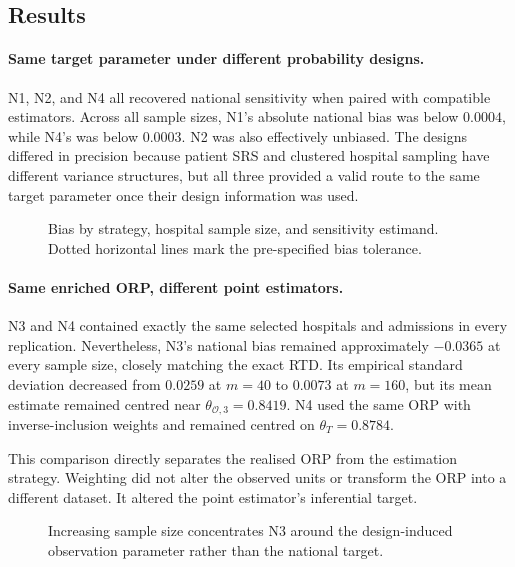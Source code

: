 \subsection{Results}

\paragraph{Same target parameter under different probability designs.}
N1, N2, and N4 all recovered national sensitivity when paired with compatible
estimators. Across all sample sizes, N1's absolute national bias was below
\(0.0004\), while N4's was below \(0.0003\). N2 was also effectively unbiased.
The designs differed in precision because patient SRS and clustered hospital
sampling have different variance structures, but all three provided a valid
route to the same target parameter once their design information was used.



\begin{figure}[h!]
  \centering
  \caption{Bias by strategy, hospital sample size, and sensitivity estimand. Dotted horizontal lines mark the pre-specified bias tolerance.}
  \label{fig:nav-bias}
\end{figure}

\paragraph{Same enriched ORP, different point estimators.}
N3 and N4 contained exactly the same selected hospitals and admissions in
every replication. Nevertheless, N3's national bias remained approximately
\(-0.0365\) at every sample size, closely matching the exact RTD. Its empirical
standard deviation decreased from \(0.0259\) at \(m=40\) to \(0.0073\) at
\(m=160\), but its mean estimate remained centred near
\(\theta_{\mathcal O,3}=0.8419\). N4 used the same ORP with inverse-inclusion
weights and remained centred on \(\theta_T=0.8784\).

This comparison directly separates the realised ORP from the estimation
strategy. Weighting did not alter the observed units or transform the ORP into
a different dataset. It altered the point estimator's inferential target.

\begin{figure}[h!]
  \centering
  \caption{Increasing sample size concentrates N3 around the design-induced observation parameter rather than the national target.}
  \label{fig:nav-large-wrong-orp}
\end{figure}

